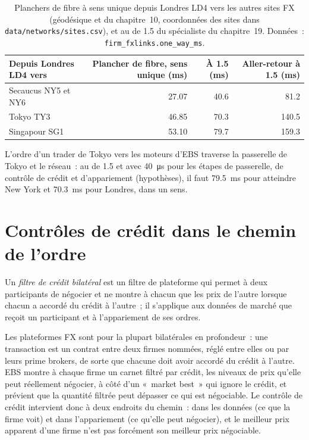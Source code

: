 \begin{table}[ht]
\centering\small
\begin{tabular}{@{}lrrr@{}}
\toprule
Depuis Londres LD4 vers & Plancher de fibre, sens unique (ms) & À 1.5 (ms) & Aller-retour à 1.5 (ms) \\
\midrule
Secaucus NY5 et NY6 & 27.07 & 40.6 & 81.2 \\
Tokyo TY3 & 46.85 & 70.3 & 140.5 \\
Singapour SG1 & 53.10 & 79.7 & 159.3 \\
\bottomrule
\end{tabular}
\caption{Planchers de fibre à sens unique depuis Londres LD4 vers les autres sites FX (géodésique et  du chapitre~10, coordonnées des sites dans
\texttt{data/networks/sites.csv}), et au  de 1.5 du spécialiste du chapitre~19. Données~: \texttt{firm\_fxlinks.one\_way\_ms}.}\label{tab:nw:fx-connectivity:floors}
\end{table}

L'ordre d'un trader de Tokyo vers les moteurs d'EBS traverse la passerelle de Tokyo et le réseau~: au  de 1.5 et avec
\qty{40}{\micro\second} pour les étapes de passerelle, de contrôle de crédit et d'appariement (hypothèses), il faut \qty{79.5}{\milli\second} pour atteindre New York et
\qty{70.3}{\milli\second} pour Londres, dans un sens.

\section{Contrôles de crédit dans le chemin de l'ordre}

\begin{definition}\label{def:nw:fx-connectivity:credit}
Un \emph{filtre de crédit bilatéral} est un filtre de plateforme qui permet à deux participants de négocier
et ne montre à chacun que les prix de l'autre lorsque chacun a accordé du crédit à l'autre~; il s'applique aux données de marché
que reçoit un participant et à l'appariement de ses ordres.
\end{definition}

Les plateformes FX sont pour la plupart bilatérales en profondeur~: une transaction est un contrat entre deux firmes nommées, réglé entre
elles ou par leurs prime brokers, de sorte que chacune doit avoir accordé du crédit à l'autre. EBS montre à chaque firme un carnet filtré par crédit, les niveaux de prix
qu'elle peut réellement négocier, à côté d'un «~market best~» qui ignore le crédit, et prévient que la quantité filtrée peut dépasser ce qui est négociable.
Le contrôle de crédit intervient donc à deux endroits du chemin~: dans les données (ce que la firme voit) et dans l'appariement (ce qu'elle peut
négocier), et le meilleur prix apparent d'une firme n'est pas forcément son meilleur prix négociable.


